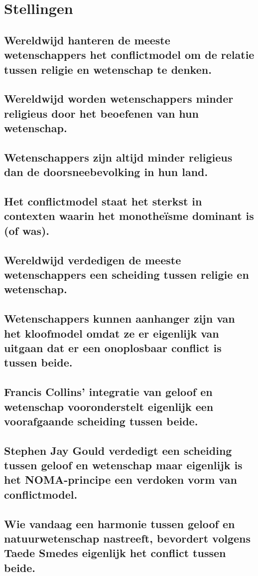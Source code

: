 \documentclass[11pt,a4paper,titlepage]{article}
\begin{document}
\section{Stellingen}
\subsection{Wereldwijd hanteren de meeste wetenschappers het conflictmodel om de relatie tussen
religie en wetenschap te denken. }
\subsection{Wereldwijd worden wetenschappers minder religieus door het beoefenen van hun
wetenschap.}
\subsection{Wetenschappers zijn altijd minder religieus dan de doorsneebevolking in hun land.}
\subsection{Het conflictmodel staat het sterkst in contexten waarin het monotheïsme dominant is (of
was).}
\subsection{Wereldwijd verdedigen de meeste wetenschappers een scheiding tussen religie en
wetenschap.}
\subsection{Wetenschappers kunnen aanhanger zijn van het kloofmodel omdat ze er eigenlijk van
uitgaan dat er een onoplosbaar conflict is tussen beide.}
\subsection{Francis Collins’ integratie van geloof en wetenschap vooronderstelt eigenlijk een voorafgaande scheiding tussen beide.}
\subsection{Stephen Jay Gould verdedigt een scheiding tussen geloof en wetenschap maar eigenlijk is het
NOMA-principe een verdoken vorm van conflictmodel.}
\subsection{Wie vandaag een harmonie tussen geloof en natuurwetenschap nastreeft, bevordert volgens
Taede Smedes eigenlijk het conflict tussen beide.}
\end{document}
